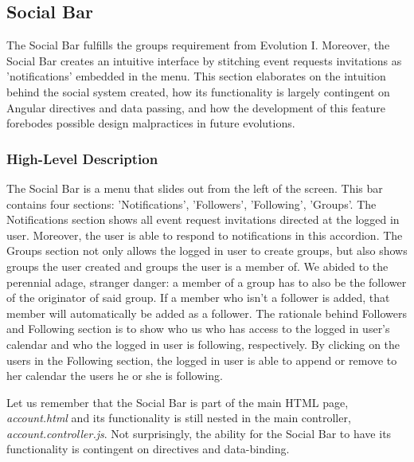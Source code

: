 \documentclass[a4paper]{article}
\begin{document}
\subsection{Social Bar}

The Social Bar fulfills the groups requirement from Evolution I. Moreover, the Social Bar creates an intuitive interface by stitching event requests invitations as 'notifications' embedded in the menu. This section elaborates on the intuition behind the social system created, how its functionality is largely contingent on Angular directives and data passing, and how the development of this feature forebodes possible design malpractices in future evolutions.

\subsubsection{High-Level Description}

The Social Bar is a menu that slides out from the left of the screen. This bar contains four sections: 'Notifications', 'Followers', 'Following', 'Groups'. The Notifications section shows all event request invitations directed at the logged in user. Moreover, the user is able to respond to notifications in this accordion. The Groups section not only allows the logged in user to create groups, but also shows groups the user created and groups the user is a member of. We abided to the perennial adage, stranger danger: a member of a group has to also be the follower of the originator of said group. If a member who isn't a follower is added, that member will automatically be added as a follower. The rationale behind Followers and Following section is to show who us who has access to the logged in user's calendar and who the logged in user is following, respectively. By clicking on the users in the Following section, the logged in user is able to append or remove to her calendar the users he or she is following.

Let us remember that the Social Bar is part of the main HTML page, \textit{account.html} and its functionality is still nested in the main controller, \textit{account.controller.js}. Not surprisingly, the ability for the Social Bar to have its functionality is contingent on directives and data-binding.
\end{document}
